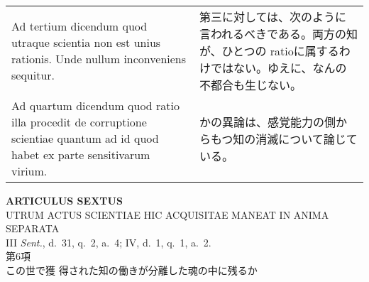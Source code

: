 \documentclass[10pt]{jsarticle} %
\begin{document}
\begin{longtable}{p{21em}p{21em}}
\\


Ad tertium dicendum quod utraque scientia non est unius rationis. Unde
nullum inconveniens sequitur.


&

第三に対しては、次のように言われるべきである。両方の知が、ひとつの
ratioに属するわけではない。ゆえに、なんの不都合も生じない。

\\


{\sc Ad quartum dicendum} quod ratio illa procedit de corruptione
scientiae quantum ad id quod habet ex parte sensitivarum virium.

&

かの異論は、感覚能力の側からもつ知の消滅について論じている。



\end{longtable}


\newpage
{}

\begin{center}
{\Large {\bf ARTICULUS SEXTUS}}\\ {\large UTRUM ACTUS SCIENTIAE HIC
ACQUISITAE MANEAT IN ANIMA SEPARATA}\\ {\footnotesize III {\it Sent.},
d.~31, q.~2, a.~4; IV, d.~1, q.~1, a.~2.}\\ {\Large 第6項\\この世で獲
得された知の働きが分離した魂の中に残るか}
\end{center}
\end{document}
